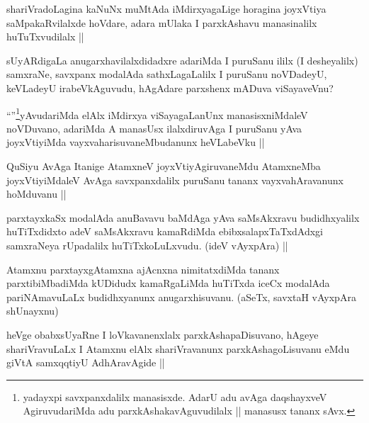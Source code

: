 \begin{artha}
shariVradoLagina kaNuNx muMtAda iMdirxyagaLige horagina  joyxVtiya saMpakaRvilalxde hoVdare, adara mUlaka I parxkAshavu manasinalilx huTuTxvudilalx ||
\end{artha}

\begin{artha}
sUyARdigaLa anugarxhavilalxdidadxre adariMda I puruSanu ililx (I desheyalilx) samxraNe, savxpanx modalAda sathxLagaLalilx I puruSanu noVDadeyU, keVLadeyU irabeVkAguvudu, hAgAdare parxshenx mADuva viSayaveVnu?
\end{artha}

\begin{artha}
``\stext''\footnote{yadayxpi savxpanxdalilx manasisxde. AdarU adu avAga daqshayxveV AgiruvudariMda adu parxkAshakavAguvudilalx || manasusx tananx sAvx.}yAvudariMda elAlx iMdirxya viSayagaLanUnx manasisxniMdaleV noVDuvano, adariMda A manasUsx ilalxdiruvAga I puruSanu yAva joyxVtiyiMda vayxvaharisuvaneMbudanunx heVLabeVku ||
\end{artha}

\begin{artha}
  QuSiyu AvAga Itanige AtamxneV joyxVtiyAgiruvaneMdu AtamxneMba joyxVtiyiMdaleV AvAga savxpanxdalilx puruSanu tananx vayxvahAravanunx hoMduvanu ||
\end{artha}

\begin{artha}
parxtayxkaSx modalAda anuBavavu baMdAga yAva saMsAkxravu budidhxyalilx huTiTxdidxto adeV saMsAkxravu kamaRdiMda ebibxsalapxTaTxdAdxgi samxraNeya rUpadalilx huTiTxkoLuLxvudu. (ideV vAyxpAra) ||
\end{artha}

\begin{artha}
Atamxnu parxtayxgAtamxna ajAcnxna nimitatxdiMda tananx parxtibiMbadiMda kUDidudx kamaRgaLiMda huTiTxda iceCx modalAda pariNAmavuLaLx budidhxyanunx anugarxhisuvanu. (aSeTx, savxtaH vAyxpAra shUnayxnu)
\end{artha}

\begin{artha}
heVge obabxsUyaRne I loVkavanenxlalx parxkAshapaDisuvano, hAgeye shariVravuLaLx I Atamxnu elAlx shariVravanunx parxkAshagoLisuvanu eMdu giVtA samxqqtiyU AdhAravAgide ||
\end{artha}

